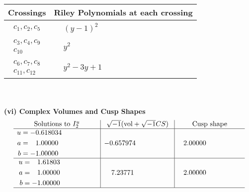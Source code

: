 \documentclass[1p]{elsarticle_modified}
\theoremstyle{definition}
\newcommand{\I}{\sqrt{-1}}
\begin{document}
\begin{tabular}{m{50pt}|m{274pt}}
Crossings & \hspace{64pt}Riley Polynomials at each crossing \\
\hline $$\begin{aligned}c_{1},c_{2},c_{5}\end{aligned}$$&$\begin{aligned}
&(y-1)^2
\end{aligned}$\\
\hline $$\begin{aligned}c_{3},c_{4},c_{9}\\c_{10}\end{aligned}$$&$\begin{aligned}
&y^2
\end{aligned}$\\
\hline $$\begin{aligned}c_{6},c_{7},c_{8}\\c_{11},c_{12}\end{aligned}$$&$\begin{aligned}
&y^2-3 y+1
\end{aligned}$\\
\hline
\end{tabular}\\~\\
\newpage\flushleft \textbf{(vi) Complex Volumes and Cusp Shapes}
$$\begin{array}{c|c|c}  
\text{Solutions to }I^u_{2}& \I (\text{vol} + \sqrt{-1}CS) & \text{Cusp shape}\\
 \hline 
\begin{aligned}
u &= -0.618034\phantom{ +0.000000I} \\
a &= \phantom{-}1.00000\phantom{ +0.000000I} \\
b &= -1.00000\phantom{ +0.000000I}\end{aligned}
 & -0.657974\phantom{ +0.000000I} & \phantom{-}2.00000\phantom{ +0.000000I} \\ \hline\begin{aligned}
u &= \phantom{-}1.61803\phantom{ +0.000000I} \\
a &= \phantom{-}1.00000\phantom{ +0.000000I} \\
b &= -1.00000\phantom{ +0.000000I}\end{aligned}
 & \phantom{-}7.23771\phantom{ +0.000000I} & \phantom{-}2.00000\phantom{ +0.000000I}\\
 \hline 
 \end{array}$$\newpage\newpage\renewcommand{\arraystretch}{1}
\end{document}
